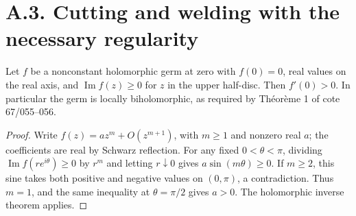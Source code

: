 \section{A.3. Cutting and welding with the necessary regularity}
\begin{lemma}
\label{A3-boundary-chart}
Let $f$ be a nonconstant holomorphic germ at zero with $f(0)=0$, real
values on the real axis, and $\operatorname{Im} f(z)\geq0$ for $z$ in
the upper half-disc. Then $f'(0)>0$. In particular the germ is locally
biholomorphic, as required by Th\'eor\`eme 1 of cote 67/055--056.
\end{lemma}
\begin{proof}
Write $f(z)=az^m+O(z^{m+1})$, with $m\geq1$ and nonzero real $a$;
the coefficients are real by Schwarz reflection. For any fixed
$0<\theta<\pi$, dividing $\operatorname{Im}f(re^{i\theta})\geq0$
by $r^m$ and letting $r\downarrow0$ gives $a\sin(m\theta)\geq0$.
If $m\geq2$, this sine takes both positive and negative values on
$(0,\pi)$, a contradiction. Thus $m=1$, and the same inequality at
$\theta=\pi/2$ gives $a>0$. The holomorphic inverse theorem applies.
\end{proof}

